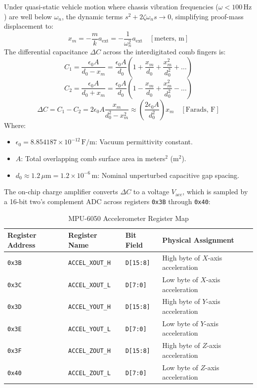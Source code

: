 \documentclass[11pt, a4paper]{article}
\begin{document}
Under quasi-static vehicle motion where chassis vibration frequencies ($\omega < 100\,\text{Hz}$) are well below $\omega_n$, the dynamic terms $s^2 + 2\zeta \omega_n s \to 0$, simplifying proof-mass displacement to:
\begin{equation}
    x_m = -\frac{m}{k} a_{\text{ext}} = -\frac{1}{\omega_n^2} a_{\text{ext}} \quad [\text{meters, m}]
\end{equation}
The differential capacitance $\Delta C$ across the interdigitated comb fingers is:
\begin{equation}
    C_1 = \frac{\epsilon_0 A}{d_0 - x_m} = \frac{\epsilon_0 A}{d_0}\left(1 + \frac{x_m}{d_0} + \frac{x_m^2}{d_0^2} + \dots\right)
\end{equation}
\begin{equation}
    C_2 = \frac{\epsilon_0 A}{d_0 + x_m} = \frac{\epsilon_0 A}{d_0}\left(1 - \frac{x_m}{d_0} + \frac{x_m^2}{d_0^2} - \dots\right)
\end{equation}
\begin{equation}
    \Delta C = C_1 - C_2 = 2 \epsilon_0 A \frac{x_m}{d_0^2 - x_m^2} \approx \left(\frac{2 \epsilon_0 A}{d_0^2}\right) x_m \quad [\text{Farads, F}]
\end{equation}
Where:
\begin{itemize}
    \item $\epsilon_0 = 8.854187 \times 10^{-12}\,\text{F/m}$: Vacuum permittivity constant.
    \item $A$: Total overlapping comb surface area in meters$^2$ ($\text{m}^2$).
    \item $d_0 \approx 1.2\,\mu\text{m} = 1.2 \times 10^{-6}\,\text{m}$: Nominal unperturbed capacitive gap spacing.
\end{itemize}

The on-chip charge amplifier converts $\Delta C$ to a voltage $V_{\text{acc}}$, which is sampled by a 16-bit two's complement ADC across registers \texttt{0x3B} through \texttt{0x40}:
\begin{table}[H]
\centering
\small
\begin{tabular}{llll}
\toprule
\textbf{Register Address} & \textbf{Register Name} & \textbf{Bit Field} & \textbf{Physical Assignment} \\
\midrule
\texttt{0x3B} & \texttt{ACCEL\_XOUT\_H} & \texttt{D[15:8]} & High byte of $X$-axis acceleration \\
\texttt{0x3C} & \texttt{ACCEL\_XOUT\_L} & \texttt{D[7:0]}  & Low byte of $X$-axis acceleration \\
\texttt{0x3D} & \texttt{ACCEL\_YOUT\_H} & \texttt{D[15:8]} & High byte of $Y$-axis acceleration \\
\texttt{0x3E} & \texttt{ACCEL\_YOUT\_L} & \texttt{D[7:0]}  & Low byte of $Y$-axis acceleration \\
\texttt{0x3F} & \texttt{ACCEL\_ZOUT\_H} & \texttt{D[15:8]} & High byte of $Z$-axis acceleration \\
\texttt{0x40} & \texttt{ACCEL\_ZOUT\_L} & \texttt{D[7:0]}  & Low byte of $Z$-axis acceleration \\
\bottomrule
\end{tabular}
\caption{MPU-6050 Accelerometer Register Map}
\label{tab:accel_reg_map}
\end{table}
\end{document}
